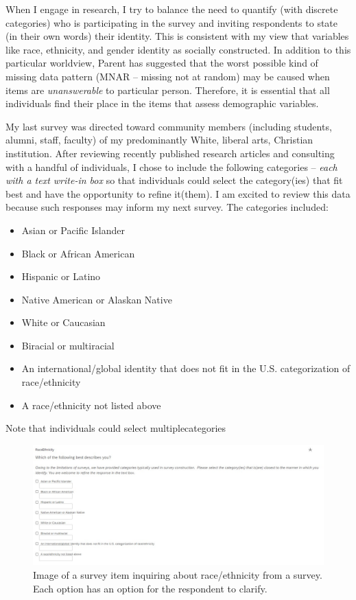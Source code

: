 \documentclass[
  english,
]{book}
\providecommand{\tightlist}{%
  \setlength{\itemsep}{0pt}\setlength{\parskip}{0pt}}
\begin{document}
When I engage in research, I try to balance the need to quantify (with discrete categories) who is participating in the survey and inviting respondents to state (in their own words) their identity. This is consistent with my view that variables like race, ethnicity, and gender identity as socially constructed. In addition to this particular worldview, Parent \citeyearpar{parent_handling_2013} has suggested that the worst possible kind of missing data pattern (MNAR -- missing not at random) may be caused when items are \emph{unanswerable} to particular person. Therefore, it is essential that all individuals find their place in the items that assess demographic variables.

My last survey was directed toward community members (including students, alumni, staff, faculty) of my predominantly White, liberal arts, Christian institution. After reviewing recently published research articles and consulting with a handful of individuals, I chose to include the following categories -- \emph{each with a text write-in box} so that individuals could select the category(ies) that fit best and have the opportunity to refine it(them). I am excited to review this data because such responses may inform my next survey. The categories included:

\begin{itemize}
\tightlist
\item
  Asian or Pacific Islander
\item
  Black or African American
\item
  Hispanic or Latino
\item
  Native American or Alaskan Native
\item
  White or Caucasian
\item
  Biracial or multiracial
\item
  An international/global identity that does not fit in the U.S. categorization of race/ethnicity
\item
  A race/ethnicity not listed above
\end{itemize}

Note that individuals could select multiplecategories

\begin{figure}
\centering
\includegraphics{images/QuestCon/RaceEthnicity.jpg}
\caption{Image of a survey item inquiring about race/ethnicity from a survey. Each option has an option for the respondent to clarify.}
\end{figure}
\end{document}
